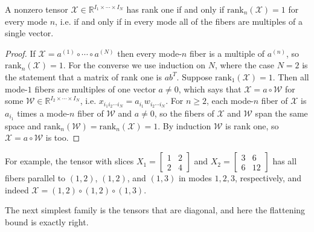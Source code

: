     \begin{lemma}
      \label{lem:rank-one-flattening}
      A nonzero tensor $\mathcal{X} \in \mathbb{R}^{I_1 \times \cdots \times I_N}$ has rank one if and only if $\mathrm{rank}_n(\mathcal{X}) = 1$ for every mode $n$, i.e. if and only if in every mode all of the fibers are multiples of a single vector. 
    \end{lemma}
    \begin{proof}
      If $\mathcal{X} = a^{(1)} \circ \cdots \circ a^{(N)}$ then every mode-$n$ fiber is a multiple of $a^{(n)}$, so $\mathrm{rank}_n(\mathcal{X}) = 1$. For the converse we use induction on $N$, where the case $N = 2$ is the statement that a matrix of rank one is $a b^T$. Suppose $\mathrm{rank}_1(\mathcal{X}) = 1$. Then all mode-$1$ fibers are multiples of one vector $a \neq 0$, which says that $\mathcal{X} = a \circ \mathcal{W}$ for some $\mathcal{W} \in \mathbb{R}^{I_2 \times \cdots \times I_N}$, i.e. $x_{i_1 i_2 \cdots i_N} = a_{i_1} w_{i_2 \cdots i_N}$. For $n \geq 2$, each mode-$n$ fiber of $\mathcal{X}$ is $a_{i_1}$ times a mode-$n$ fiber of $\mathcal{W}$ and $a \neq 0$, so the fibers of $\mathcal{X}$ and $\mathcal{W}$ span the same space and $\mathrm{rank}_n(\mathcal{W}) = \mathrm{rank}_n(\mathcal{X}) = 1$. By induction $\mathcal{W}$ is rank one, so $\mathcal{X} = a \circ \mathcal{W}$ is too. 
    \end{proof}

    For example, the tensor with slices $X_1 = \begin{bmatrix} 1 & 2 \\ 2 & 4 \end{bmatrix}$ and $X_2 = \begin{bmatrix} 3 & 6 \\ 6 & 12 \end{bmatrix}$ has all fibers parallel to $(1, 2)$, $(1, 2)$, and $(1, 3)$ in modes $1, 2, 3$, respectively, and indeed $\mathcal{X} = (1, 2) \circ (1, 2) \circ (1, 3)$. 

    The next simplest family is the tensors that are diagonal, and here the flattening bound is exactly right. 

